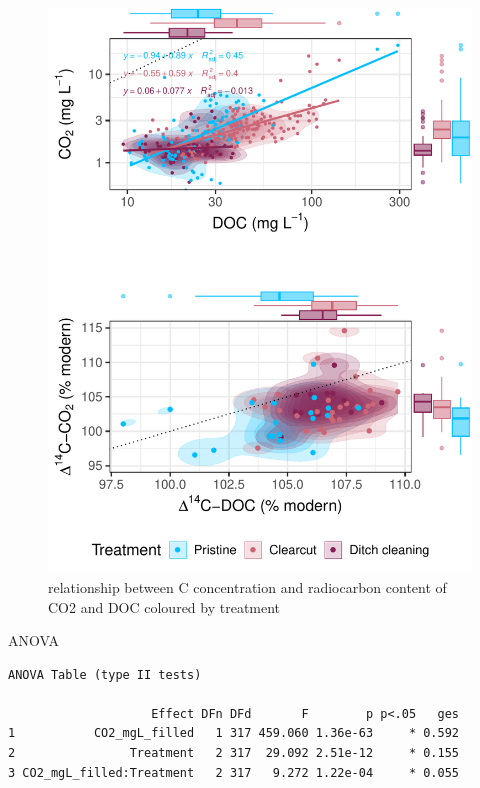 \documentclass[
]{article}
\begin{document}
\begin{figure}[H]

{\centering \includegraphics{index_files/figure-pdf/unnamed-chunk-6-1.pdf}

}

\caption{relationship between C concentration and radiocarbon content of
CO2 and DOC coloured by treatment}

\end{figure}%

ANOVA

\begin{verbatim}
ANOVA Table (type II tests)

                    Effect DFn DFd       F        p p<.05   ges
1           CO2_mgL_filled   1 317 459.060 1.36e-63     * 0.592
2                Treatment   2 317  29.092 2.51e-12     * 0.155
3 CO2_mgL_filled:Treatment   2 317   9.272 1.22e-04     * 0.055
\end{verbatim}
\end{document}
